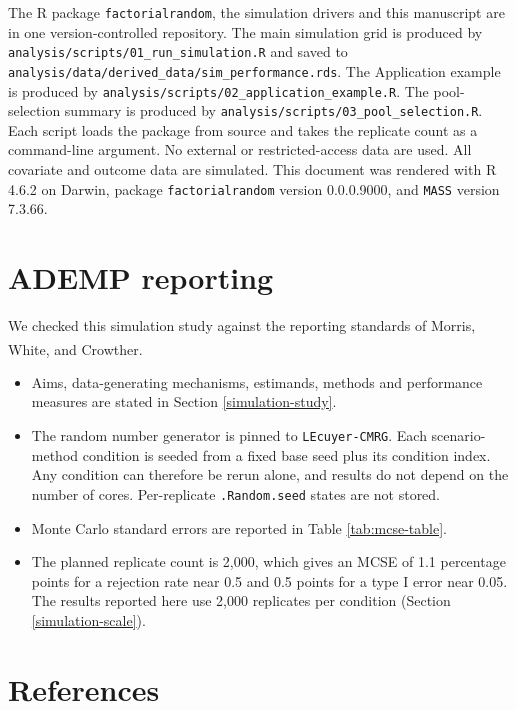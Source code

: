 \documentclass[
  11pt,
]{article}
\providecommand{\tightlist}{%
  \setlength{\itemsep}{0pt}\setlength{\parskip}{0pt}}
\begin{document}
The R package \texttt{factorialrandom}, the simulation drivers and
this manuscript are in one version-controlled repository.
The main simulation grid is produced by
\texttt{analysis/scripts/01\_run\_simulation.R} and saved to
\texttt{analysis/data/derived\_data/sim\_performance.rds}. The
Application example is produced by
\texttt{analysis/scripts/02\_application\_example.R}. The
pool-selection summary is produced by
\texttt{analysis/scripts/03\_pool\_selection.R}. Each script loads
the package from source and takes the replicate count as a
command-line argument. No external or restricted-access data
are used. All covariate and outcome data are simulated. This
document was rendered with R 4.6.2 on
Darwin, package \texttt{factorialrandom} version
0.0.0.9000, and \texttt{MASS} version 7.3.66.

\section*{ADEMP reporting}\label{ademp-reporting}

We checked this simulation study against the reporting
standards of Morris, White, and Crowther\textsuperscript{}.

\begin{itemize}
\tightlist
\item
  Aims, data-generating mechanisms, estimands, methods and
  performance measures are stated in Section
  \ref{simulation-study}.
\item
  The random number generator is pinned to
  \texttt{L\textquotesingle{}Ecuyer-CMRG}. Each scenario-method condition is seeded
  from a fixed base seed plus its condition index. Any
  condition can therefore be rerun alone, and results do not
  depend on the number of cores. Per-replicate
  \texttt{.Random.seed} states are not stored.
\item
  Monte Carlo standard errors are reported in Table
  \ref{tab:mcse-table}.
\item
  The planned replicate count is 2,000, which gives an MCSE
  of 1.1 percentage points for a rejection rate near 0.5 and
  0.5 points for a type I error near 0.05. The results
  reported here use 2,000 replicates per condition
  (Section \ref{simulation-scale}).
\end{itemize}

\section*{References}\label{references}
\end{document}
